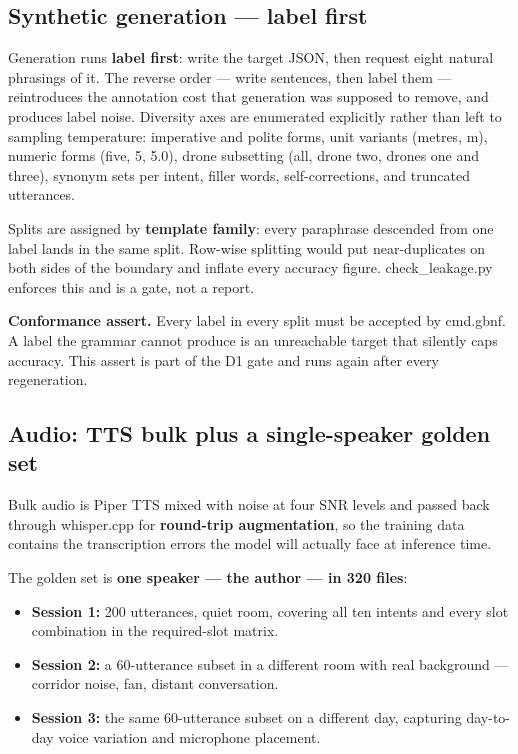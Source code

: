 \documentclass[11pt,a4paper]{article}
\newcommand{\code}[1]{{\ttfamily\small #1}}
\begin{document}
\subsection{Synthetic generation --- label first}

Generation runs \textbf{label first}: write the target JSON, then request eight natural phrasings of it.
The reverse order --- write sentences, then label them --- reintroduces the annotation cost that generation
was supposed to remove, and produces label noise. Diversity axes are enumerated explicitly rather than
left to sampling temperature: imperative and polite forms, unit variants (metres, m), numeric forms (five,
5, 5.0), drone subsetting (all, drone two, drones one and three), synonym sets per intent, filler words,
self-corrections, and truncated utterances.

Splits are assigned by \textbf{template family}: every paraphrase descended from one label lands in the
same split. Row-wise splitting would put near-duplicates on both sides of the boundary and inflate every
accuracy figure. \code{check\_leakage.py} enforces this and is a gate, not a report.

\textbf{Conformance assert.} Every label in every split must be accepted by \code{cmd.gbnf}. A label the
grammar cannot produce is an unreachable target that silently caps accuracy. This assert is part of the
D1 gate and runs again after every regeneration.

\subsection{Audio: TTS bulk plus a single-speaker golden set}

Bulk audio is Piper TTS mixed with noise at four SNR levels and passed back through \code{whisper.cpp} for
\textbf{round-trip augmentation}, so the training data contains the transcription errors the model will
actually face at inference time.

The golden set is \textbf{one speaker --- the author --- in 320 files}:

\begin{itemize}[leftmargin=1.4em,itemsep=2pt]
  \item \textbf{Session 1:} 200 utterances, quiet room, covering all ten intents and every slot
        combination in the required-slot matrix.
  \item \textbf{Session 2:} a 60-utterance subset in a different room with real background --- corridor
        noise, fan, distant conversation.
  \item \textbf{Session 3:} the same 60-utterance subset on a different day, capturing day-to-day voice
        variation and microphone placement.
\end{itemize}
\end{document}

